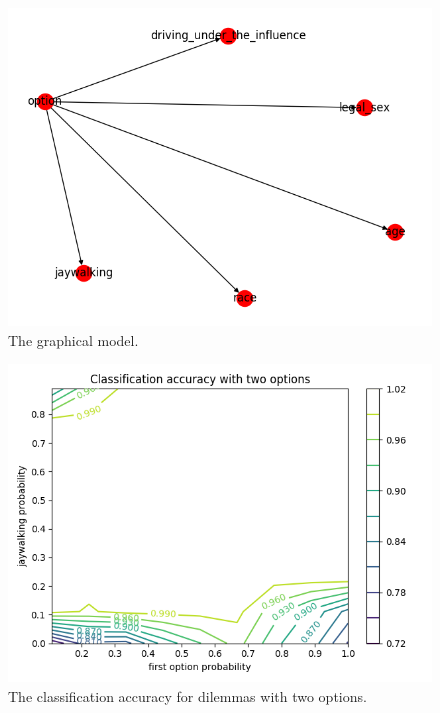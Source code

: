 \documentclass{report}
\begin{document}
\begin{figure}[h]
    \centering
    \includegraphics[scale=0.6]{network.png}
    \caption[]{The graphical model.}
    \label{fig:graphical_model_image}
\end{figure}

\begin{figure}[h]
    \centering
    \includegraphics[scale=0.5]{accuracy_with_two_options_contour_plot.png}
    \caption[]{The classification accuracy for dilemmas with two options.}
    \label{fig:accuracy_with_two_options_contour_plot}
\end{figure}
\end{document}
